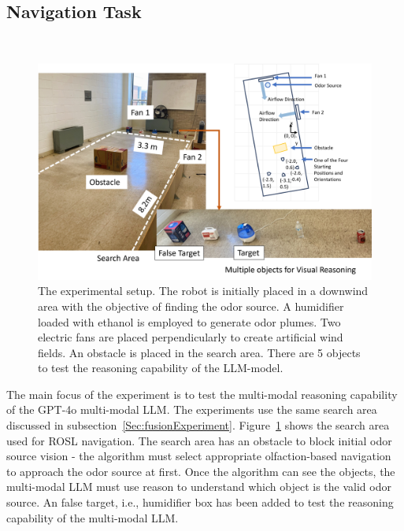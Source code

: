 \subsection{Navigation Task}\label{Subsec:LLMNavigationTask}

\begin{figure}[h!]

\ \\
\vspace*{-.18in}

\begin{center}
\includegraphics[width=0.9\columnwidth]{Main/Figure/LLMSearchArea.png}\hspace*{0.04in}
\end{center}
\vspace{-.1in}

\caption
{The experimental setup. The robot is initially placed in a downwind area with the objective of finding the odor source. A humidifier loaded with ethanol is employed to generate odor plumes. Two electric fans are placed perpendicularly to create artificial wind fields. An obstacle is placed in the search area. There are 5 objects to test the reasoning capability of the LLM-model.}
\label{fig:LLMSearchArea}
\end{figure}

The main focus of the experiment is to test the multi-modal reasoning capability of the GPT-4o multi-modal LLM. The experiments use the same search area discussed in subsection~\ref{Sec:fusionExperiment}. Figure~\ref{fig:LLMSearchArea} shows the search area used for ROSL navigation. The search area has an obstacle to block initial odor source vision - the algorithm must select appropriate olfaction-based navigation to approach the odor source at first. Once the algorithm can see the objects, the multi-modal LLM must use reason to understand which object is the valid odor source. An false target, i.e., humidifier box has been added to test the reasoning capability of the multi-modal LLM. 


